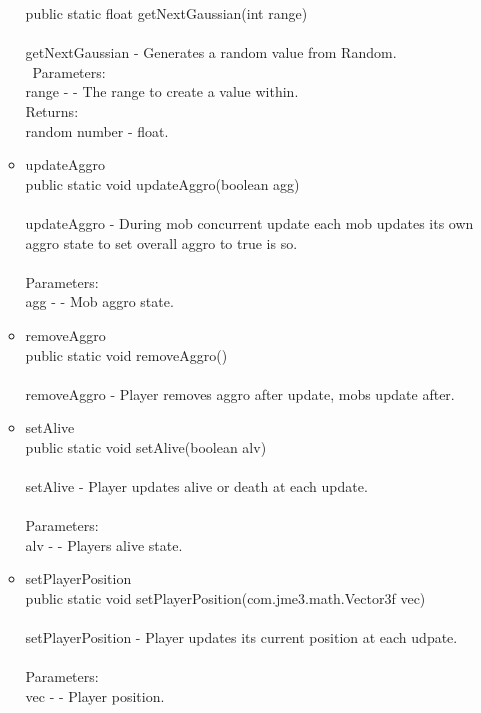 \documentclass[letterpaper]{article}
\begin{document}
\begin{itemize}
\begin{itemize}
													public static float getNextGaussian(int range) \\ \\
													getNextGaussian - Generates a random value from Random. \\ \
													Parameters: \\
													range - - The range to create a value within. \\
													Returns: \\
													random number - float. \\
											\item	updateAggro \\
													public static void updateAggro(boolean agg) \\ \\
													updateAggro - During mob concurrent update each mob updates its own aggro state to set overall aggro to true is so. \\ \\
													Parameters: \\
													agg - - Mob aggro state. \\
											\item	removeAggro \\
													public static void removeAggro() \\ \\
													removeAggro - Player removes aggro after update, mobs update after. \\
											\item	setAlive \\
													public static void setAlive(boolean alv) \\ \\
													setAlive - Player updates alive or death at each update. \\ \\
													Parameters: \\
													alv - - Players alive state.
											\item	setPlayerPosition \\
													public static void setPlayerPosition(com.jme3.math.Vector3f vec) \\ \\
													setPlayerPosition - Player updates its current position at each udpate. \\ \\
													Parameters: \\
													vec - - Player position.
										\end{itemize}
							\end{itemize}
						
\end{document}
